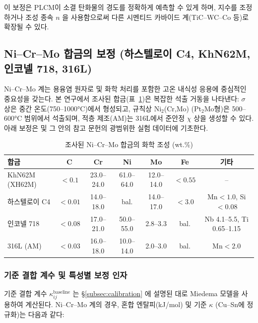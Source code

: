 \documentclass[12pt,a4paper]{article}
\begin{document}
	이 보정은 PLCM이 소결 탄화물의 경도를 정확하게 예측할 수 있게 하며, 지수를 조정하거나 조성 종속 $n$ 을 사용함으로써 다른 시멘티드 카바이드 계(TiC–WC–Co 등)로 확장될 수 있다.
	
	
	\subsection{Ni–Cr–Mo 합금의 보정 (하스텔로이 C4, KhN62M, 인코넬 718, 316L)}
	\label{subsec:calibration_nicrmo}
	
	Ni–Cr–Mo 계는 용융염 원자로 및 화학 처리를 포함한 고온 내식성 응용에 중심적인 중요성을 갖는다. 본 연구에서 조사된 합금(표~\ref{tab:nicrmo_compositions})은 복잡한 석출 거동을 나타낸다: $\sigma$ 상은 중간 온도(750–1000°C)에서 형성되고, 규칙상 Ni$_2$(Cr,Mo) (Pt$_2$Mo형)은 500–600°C 범위에서 석출되며, 적층 제조(AM)는 316L에서 준안정 $\chi$ 상을 생성할 수 있다. 아래 보정은 \cite{dis2025} 및 그 안의 참고 문헌의 광범위한 실험 데이터에 기초한다.
	
	\begin{table}[htbp]
		\centering
		\caption{조사된 Ni–Cr–Mo 합금의 화학 조성 (wt.\%)}
		\label{tab:nicrmo_compositions}
		\begin{tabular}{lcccccc}
			\toprule
			\textbf{합금} & \textbf{C} & \textbf{Cr} & \textbf{Ni} & \textbf{Mo} & \textbf{Fe} & \textbf{기타} \\
			\midrule
			KhN62M (XH62M) & \(<0.1\) & 23.0–24.0 & 61.0–64.0 & 12.0–14.0 & \(<0.55\) & – \\
			하스텔로이 C4   & \(<0.01\) & 14.0–18.0 & bal. & 14.0–17.0 & \(<3.0\) & Mn\(<1.0\), Si\(<0.08\) \\
			인코넬 718    & \(<0.08\) & 17.0–21.0 & 50.0–55.0 & 2.8–3.3 & bal. & Nb 4.1–5.5, Ti 0.65–1.15 \\
			316L (AM)      & \(<0.03\) & 16.0–18.0 & 10.0–14.0 & 2.0–3.0 & bal. & Mn\(<2.0\) \\
			\bottomrule
		\end{tabular}
	\end{table}
	
	\subsubsection{기준 결합 계수 및 특성별 보정 인자}
	기준 결합 계수 $\kappa_{ij}^{\text{baseline}}$ 는 \S\ref{subsec:calibration} 에 설명된 대로 Miedema 모델을 사용하여 계산된다. Ni–Cr–Mo 계의 경우, 혼합 엔탈피(kJ/mol) 및 기준 $\kappa$ (Cu–Sn에 정규화)는 다음과 같다:
	
\end{document}
